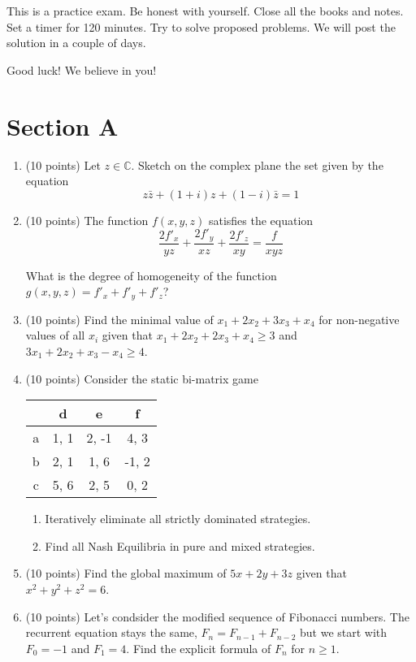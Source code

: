 \documentclass[12pt]{article} %
\theoremstyle{definition} %
\begin{document}
This is a practice exam. Be honest with yourself. Close all the books and notes.  
Set a timer for 120 minutes. Try to solve proposed problems.  
We will post the solution in a couple of days. 

Good luck! We believe in you!

\section*{Section A}

\begin{enumerate}
  \item (10 points) Let $z \in \mathbb{C}$. 
  Sketch on the complex plane the set given by the equation
  \[
     z\bar z + (1 + i)z + (1-i)\bar z = 1   
  \]

  \item (10 points) The function $f(x, y, z)$ satisfies the equation
  \[
     \frac{2f'_x}{yz} + \frac{2f'_y}{xz} + \frac{2f'_z}{xy} = \frac{f}{xyz}    
  \]

  What is the degree of homogeneity of the function $g(x, y, z) = f'_x + f'_y + f'_z$?

 \item (10 points) Find the minimal value of $x_1 + 2x_2 + 3x_3 + x_4$ 
 for non-negative values of all $x_i$ given that $x_1 + 2x_2 + 2x_3 + x_4 \geq 3$ and $3x_1 + 2x_2 + x_3 - x_4\geq 4$.

 \item (10 points) Consider the static bi-matrix game

 \begin{tabular}{c|ccc}
   & d & e & f \\
\midrule
a & 1, 1 & 2, -1 & 4, 3 \\
b & 2, 1 & 1, 6 & -1, 2 \\
c & 5, 6 & 2, 5 & 0, 2 \\
 \end{tabular}



\begin{enumerate}
    \item Iteratively eliminate all strictly dominated strategies. 
    \item Find all Nash Equilibria in pure and mixed strategies.
\end{enumerate}

 
  \item (10 points) Find the global maximum of $5x + 2y + 3z$ given that $x^2 + y^2 + z^2 = 6$.

  \item (10 points) Let's condsider the modified sequence of Fibonacci numbers.
  The recurrent equation stays the same, $F_n = F_{n-1} + F_{n-2}$ 
  but we start with $F_0 = -1$ and $F_1 = 4$. 
  Find the explicit formula of $F_n$ for $n\geq 1$.


\end{enumerate}
\end{document}
